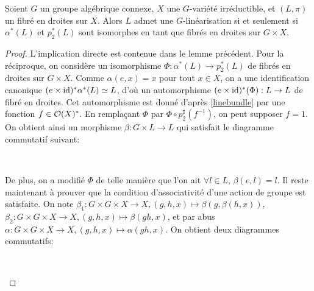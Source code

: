 \begin{lem}\label{existenceGLin}
Soient $G$ un groupe algébrique connexe, $X$ une $G$-variété irréductible, et $(L,\pi)$ un fibré en droites sur $X$. Alors $L$ admet une $G$-linéarisation si et seulement si $\alpha^*(L)$ et $p_2^*(L)$ sont isomorphes en tant que fibrés en droites sur $G\times X$.
\end{lem}
\begin{proof}
L'implication directe est contenue dans le lemme précédent. Pour la réciproque, on considère un isomorphisme $\Phi:\alpha^*(L)\rightarrow p_2^*(L)$ de fibrés en droites sur $G\times X$. Comme $\alpha(e,x)=x$ pour tout $x\in X$, on a une identification canonique $(e\times \operatorname{id})^*\alpha^*(L)\simeq L$, d'où un automorphisme $(e\times \operatorname{id})^*(\Phi):L\rightarrow L$ de fibré en droites. Cet automorphisme est donné d'après \ref{linebundle} par une fonction $f\in \mathcal{O}(X)^*$. En remplaçant $\Phi$ par $\Phi\circ p_2^\sharp(f^{-1})$, on peut supposer $f=1$. On obtient ainsi un morphisme  $\beta: G\times L \rightarrow L$ qui satisfait le diagramme commutatif suivant:
	\begin{center}
	\\
	\end{center}
De plus, on a modifié $\Phi$ de telle manière que l'on ait $\forall l\in L,\,\beta(e,l)=l$. Il reste maintenant à prouver que la condition d'associativité d'une action de groupe est satisfaite. On note $\beta_1:G\times G\times X\rightarrow X, (g,h,x)\mapsto \beta(g,\beta(h, x))$, $\beta_2:G\times G\times X\rightarrow X, (g,h,x)\mapsto \beta(gh, x)$, et par abus $\alpha:G\times G\times X\rightarrow X, (g,h,x)\mapsto \alpha(gh, x)$. On obtient deux diagrammes commutatifs:
	\begin{center}
	\,\,\,\,\,\,\,\,\,\,\,\,
\end{center}
\end{proof}
